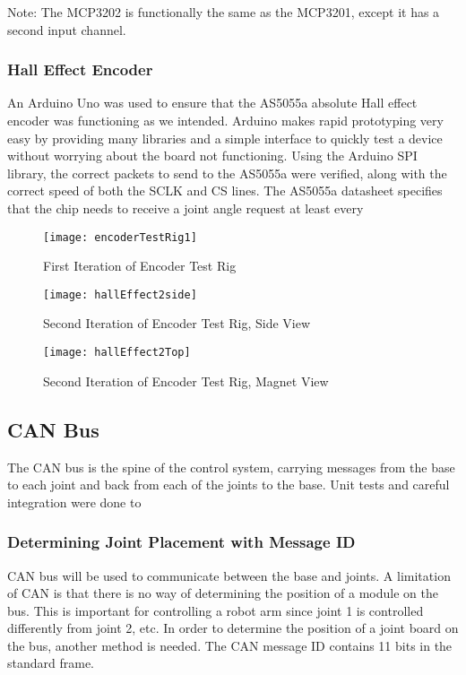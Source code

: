 \noindent Note: The MCP3202 is functionally the same as the MCP3201, except it has a second input channel.


\subsubsection{Hall Effect Encoder}
An Arduino Uno was used to ensure that the AS5055a absolute Hall effect encoder was functioning as we intended. Arduino makes rapid prototyping very easy by providing many libraries and a simple interface to quickly test a device without worrying about the board not functioning. Using the Arduino SPI library, the correct packets to send to the AS5055a were verified, along with the correct speed of both the SCLK and CS lines. The AS5055a datasheet specifies that the chip needs to receive a joint angle request at least every


\begin{figure}[H]
\centering
\texttt{[image: encoderTestRig1]}
\caption{First Iteration of Encoder Test Rig}
\label{fig:First Iteration of Encoder Test Rig}
\end{figure}


\begin{figure}[H]
	\centering
	\texttt{[image: hallEffect2side]}
	\caption{Second Iteration of Encoder Test Rig, Side View}
	\label{fig:Second Iteration of Encoder Test Rig, Side View}
\end{figure}

\begin{figure}[H]
	\centering
	\texttt{[image: hallEffect2Top]}
	\caption{Second Iteration of Encoder Test Rig, Magnet View}
	\label{fig:Second Iteration of Encoder Test Rig, Magnet View}
\end{figure}

\subsection{CAN Bus}
The CAN bus is the spine of the control system, carrying messages from the base to each joint and back from each of the joints to the base. Unit tests and careful integration were done to 

\subsubsection{Determining Joint Placement with Message ID}
CAN bus will be used to communicate between the base and joints. A limitation of CAN is that there is no way of determining the position of a module on the bus. This is important for controlling a robot arm since joint 1 is controlled differently from joint 2, etc. In order to determine the position of a joint board on the bus, another method is needed. The CAN message ID contains 11 bits in the standard frame.

